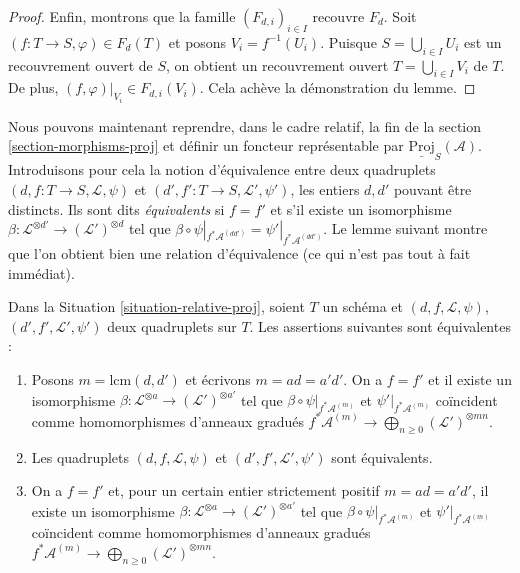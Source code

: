 \begin{proof}
\medskip\noindent
Enfin, montrons que la famille $(F_{d, i})_{i \in I}$ recouvre $F_d$.
Soit $(f : T \to S, \varphi) \in F_d(T)$ et posons
$V_i = f^{-1}(U_i)$. Puisque $S = \bigcup_{i \in I} U_i$ est un
recouvrement ouvert de $S$, on obtient un recouvrement ouvert
$T = \bigcup_{i \in I} V_i$ de $T$. De plus, $(f, \varphi)|_{V_i} \in F_{d, i}(V_i)$.
Cela achève la démonstration du lemme.
\end{proof}

\noindent
Nous pouvons maintenant reprendre, dans le cadre relatif, la fin de la
section \ref{section-morphisms-proj}
et définir un foncteur représentable
par $\underline{\text{Proj}}_S(\mathcal{A})$.
Introduisons pour cela la notion d'équivalence entre deux quadruplets
$(d, f : T \to S, \mathcal{L}, \psi)$ et
$(d', f' : T \to S, \mathcal{L}', \psi')$, les entiers $d, d'$
pouvant être distincts. Ils sont dits {\it équivalents} si $f = f'$ et
s'il existe un isomorphisme
$\beta : \mathcal{L}^{\otimes d'} \to (\mathcal{L}')^{\otimes d}$
tel que
$\beta \circ \psi|_{f^*\mathcal{A}^{(dd')}} = \psi'|_{f^*\mathcal{A}^{(dd')}}$.
Le lemme suivant montre que l'on
obtient bien une relation d'équivalence
(ce qui n'est pas tout à fait immédiat).

\begin{lemma}
\label{lemma-equivalent-relative}
Dans la Situation \ref{situation-relative-proj}, soient $T$ un schéma et
$(d, f, \mathcal{L}, \psi)$, $(d', f', \mathcal{L}', \psi')$ deux
quadruplets sur $T$. Les assertions suivantes sont équivalentes :
\begin{enumerate}
\item Posons $m = \text{lcm}(d, d')$ et écrivons $m = ad = a'd'$.
On a $f = f'$ et il existe un isomorphisme
$\beta : \mathcal{L}^{\otimes a} \to (\mathcal{L}')^{\otimes a'}$
tel que $\beta \circ \psi|_{f^*\mathcal{A}^{(m)}}$ et
$\psi'|_{f^*\mathcal{A}^{(m)}}$
coïncident comme homomorphismes d'anneaux
gradués
$f^*\mathcal{A}^{(m)} \to \bigoplus_{n \geq 0} (\mathcal{L}')^{\otimes mn}$.
\item Les quadruplets $(d, f, \mathcal{L}, \psi)$ et
$(d', f', \mathcal{L}', \psi')$ sont équivalents.
\item On a $f = f'$ et, pour un certain entier strictement positif
$m = ad = a'd'$, il existe un isomorphisme
$\beta : \mathcal{L}^{\otimes a} \to (\mathcal{L}')^{\otimes a'}$
tel que $\beta \circ \psi|_{f^*\mathcal{A}^{(m)}}$ et
$\psi'|_{f^*\mathcal{A}^{(m)}}$
coïncident comme homomorphismes d'anneaux
gradués
$f^*\mathcal{A}^{(m)} \to \bigoplus_{n \geq 0} (\mathcal{L}')^{\otimes mn}$.
\end{enumerate}
\end{lemma}

